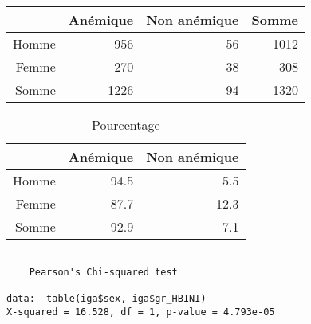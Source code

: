 \documentclass[11pt,a4paper]{article}\usepackage[]{graphicx}\usepackage[]{color}
\makeatletter
\newenvironment{kframe}{%
 \def\at@end@of@kframe{}%
 \ifinner\ifhmode%
  \def\at@end@of@kframe{\end{minipage}}%
  \begin{minipage}{\columnwidth}%
 \fi\fi%
 \def\FrameCommand##1{\hskip\@totalleftmargin \hskip-\fboxsep
 \colorbox{shadecolor}{##1}\hskip-\fboxsep
     \hskip-\linewidth \hskip-\@totalleftmargin \hskip\columnwidth}%
 \MakeFramed {\advance\hsize-\width
   \@totalleftmargin\z@ \linewidth\hsize
   \@setminipage}}%
 {\par\unskip\endMakeFramed%
 \at@end@of@kframe}
\newenvironment{knitrout}{}{} %
\makeatother
\begin{document}
\begin{table}[ht]
\centering
\begin{tabular}{rrrr}
  \hline
 & Anémique & Non anémique & Somme \\ 
  \hline
Homme & 956 & 56 & 1012 \\ 
  Femme & 270 & 38 & 308 \\ 
  Somme & 1226 & 94 & 1320 \\ 
   \hline
\end{tabular}
\end{table}
\begin{table}[ht]
\centering
\begin{tabular}{rrr}
  \hline
 & Anémique & Non anémique \\ 
  \hline
Homme & 94.5 & 5.5 \\ 
  Femme & 87.7 & 12.3 \\ 
  Somme & 92.9 & 7.1 \\ 
   \hline
\end{tabular}
\caption{Pourcentage} 
\end{table}


\begin{knitrout}
\color{fgcolor}\begin{kframe}
\begin{verbatim}

	Pearson's Chi-squared test

data:  table(iga$sex, iga$gr_HBINI)
X-squared = 16.528, df = 1, p-value = 4.793e-05
\end{verbatim}
\end{kframe}
\end{knitrout}
\end{document}
